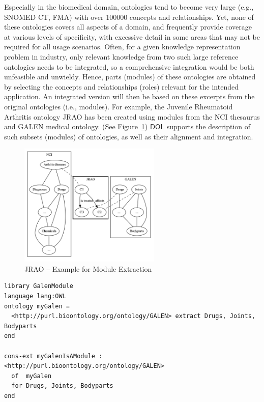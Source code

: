 \documentclass[10pt, a4paper]{isov2}
\newcommand*{\DOL}{\ensuremath{\mathsf{DOL}}\xspace}
\renewcommand{\figurerefname}{Figure}
\renewcommand{\fref}[1]{\figurerefname~\ref{#1}}
\begin{document}
\label{onto-3}
Especially in the biomedical domain, ontologies tend to become very large (e.g., SNOMED CT, FMA) 
with over 100000 concepts and relationships. Yet, none of these ontologies covers all aspects of a 
domain, and frequently provide coverage at various levels of specificity, with excessive detail in 
some areas that may not be required for all usage scenarios. Often, for a given knowledge 
representation problem in industry, only relevant knowledge from two such large reference 
ontologies needs to be integrated, so a comprehensive integration would be both unfeasible and 
unwieldy. Hence, parts (modules) of these ontologies are obtained by selecting the concepts and 
relationships (roles) relevant for the intended application. An integrated version will then be 
based on these excerpts from the original ontologies (i.e., modules). For example, the Juvenile 
Rheumatoid Arthritis ontology JRAO has been created using modules from the NCI thesaurus and GALEN 
medical ontology. (See \fref{JRAO}) \DOL  
supports the description of such subsets (modules) of ontologies, as well as their alignment and 
integration.


\begin{figure}[htbp]
\begin{center}
\includegraphics[width=0.6\textwidth]{useCaseOnto3.png}
\caption{JRAO  -- Example for Module Extraction}
\label{JRAO}
\end{center}
\end{figure}


\begin{lstlisting}[basicstyle=\ttfamily,language=dolText,escapechar=@,mathescape]
%prefix( lang:  <http://purl.net/DOL/languages/> )%
library GalenModule
language lang:OWL
ontology myGalen = 
  <http://purl.bioontology.org/ontology/GALEN> extract Drugs, Joints, Bodyparts
end

cons-ext myGalenIsAModule : <http://purl.bioontology.org/ontology/GALEN>
  of  myGalen 
  for Drugs, Joints, Bodyparts
end
\end{lstlisting}
\end{document}

